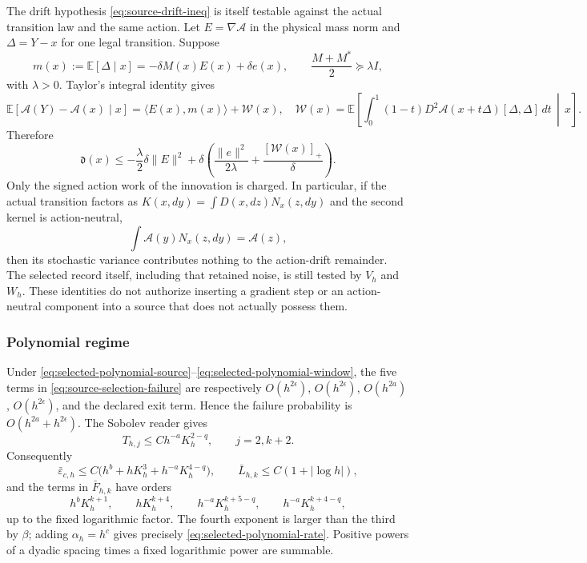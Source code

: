 \documentclass[11pt]{article}
\numberwithin{equation}{section}
\theoremstyle{definition}
\theoremstyle{remark}
\newcommand{\norm}[1]{\lVert#1\rVert}
\newcommand{\ip}[2]{\langle#1,#2\rangle}
\begin{document}
The drift hypothesis \eqref{eq:source-drift-ineq} is itself testable against the actual transition law and the same action.  Let $E=\nabla\mathcal A$ in the physical mass norm and $\Delta=Y-x$ for one legal transition.  Suppose
\begin{equation}
 m(x):=\mathbb E[\Delta\mid x]
 =-\delta M(x)E(x)+\delta e(x),
 \qquad \frac{M+M^*}{2}\succeq\lambda I,
 \label{eq:app-mean-incidence}
\end{equation}
with $\lambda>0$.  Taylor's integral identity gives
\begin{equation}
 \mathbb E[\mathcal A(Y)-\mathcal A(x)\mid x]
 =\ip{E(x)}{m(x)}+\mathcal W(x),
 \quad
 \mathcal W(x)=\mathbb E\!\left[\int_0^1(1-t)D^2\mathcal A(x+t\Delta)[\Delta,\Delta]\,dt\,\middle|\,x\right].
 \label{eq:app-signed-work}
\end{equation}
Therefore
\begin{equation}
 \mathfrak d(x)\le-\frac\lambda2\delta\norm E^2
 +\delta\left(\frac{\norm e^2}{2\lambda}+\frac{[\mathcal W(x)]_+}{\delta}\right).
 \label{eq:app-work-drift}
\end{equation}
Only the signed action work of the innovation is charged.  In particular, if the actual transition factors as $K(x,dy)=\int D(x,dz)N_x(z,dy)$ and the second kernel is action-neutral,
\begin{equation}
 \int\mathcal A(y)N_x(z,dy)=\mathcal A(z),
 \label{eq:app-action-neutral}
\end{equation}
then its stochastic variance contributes nothing to the action-drift remainder.  The selected record itself, including that retained noise, is still tested by $V_h$ and $W_h$.  These identities do not authorize inserting a gradient step or an action-neutral component into a source that does not actually possess them.

\subsubsection{Polynomial regime}
\label{app:native-polynomial-proof}

Under \eqref{eq:selected-polynomial-source}--\eqref{eq:selected-polynomial-window}, the five terms in \eqref{eq:source-selection-failure} are respectively $O(h^{2\epsilon})$, $O(h^{2\epsilon})$, $O(h^{2a})$, $O(h^{2\epsilon})$, and the declared exit term.  Hence the failure probability is $O(h^{2a}+h^{2\epsilon})$.  The Sobolev reader gives
\begin{equation}
 T_{h,j}\le C h^{-a}K_h^{2-q},\qquad j=2,k+2.
 \label{eq:app-polynomial-tail}
\end{equation}
Consequently
\[
 \bar\varepsilon_{c,h}
 \le C\bigl(h^b+hK_h^3+h^{-a}K_h^{4-q}\bigr),
 \qquad \bar L_{h,k}\le C(1+|\log h|),
\]
and the terms in $\bar F_{h,k}$ have orders
\[
 h^bK_h^{k+1},\qquad hK_h^{k+4},\qquad
 h^{-a}K_h^{k+5-q},\qquad h^{-a}K_h^{k+4-q},
\]
up to the fixed logarithmic factor.  The fourth exponent is larger than the third by $\beta$; adding $\alpha_h=h^c$ gives precisely \eqref{eq:selected-polynomial-rate}.  Positive powers of a dyadic spacing times a fixed logarithmic power are summable.
\end{document}
